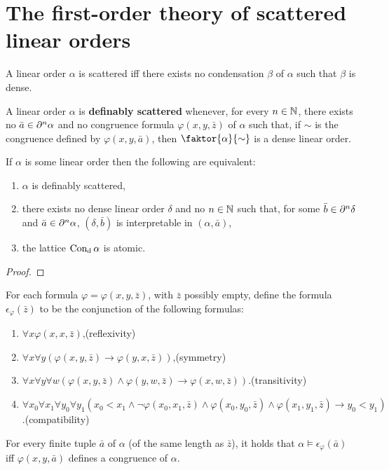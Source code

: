 \section{The first-order theory of scattered linear orders}


\begin{prp}
        A linear order $\alpha$ is scattered iff there exists no condensation $\beta$ of $\alpha$ such that $\beta$ is dense.
    \end{prp}

    \begin{dfn}
	    A linear order $\alpha$ is \textbf{definably scattered} whenever, for every $n\in\mathbb{N}$, there exists no $\bar{a}\in\partial^{n}\alpha$ and no congruence formula $\varphi(x,y,\bar{z})$ of $\alpha$ such that, if $\sim$ is the congruence defined by $\varphi(x,y,\bar{a})$, then $\faktor{\alpha}{\sim}$ is a dense linear order.
    \end{dfn}

\begin{prp}
        If $\alpha$ is some linear order then the following are equivalent:
        \begin{enumerate}
            \item   $\alpha$ is definably scattered,
	    \item   there exists no dense linear order $\delta$ and no $n\in\mathbb{N}$ such that, for some $\bar{b}\in\partial^{n}\delta$ and $\bar{a}\in\partial^{n}\alpha$, $(\delta,\bar{b})$ is interpretable in $(\alpha,\bar{a})$,
            \item   the lattice $\operatorname{Con_d}\alpha$ is atomic.
        \end{enumerate}
\end{prp}
    	\begin{proof}

	\end{proof}

\begin{prp}\label{prp:dcform}
	For each formula $\varphi=\varphi(x,y,\bar{z})$, with $\bar{z}$ possibly empty, define the formula $\epsilon_\varphi(\bar{z})$ to be the conjunction of the following formulas:
	\begin{enumerate}
		\item	$\forall x\varphi(x,x,\bar{z})$,\hfill(reflexivity)
		\item	$\forall x\forall y(\varphi(x,y,\bar{z})\rightarrow\varphi(y,x,\bar{z}))$,\hfill (symmetry)
		\item 	$\forall x\forall y\forall w(\varphi(x,y,\bar{z})\wedge\varphi(y,w,\bar{z})\rightarrow\varphi(x,w,\bar{z}))$.\hfill (transitivity)
		\item 	$\forall x_0\forall x_1\forall y_0\forall y_1(x_0<x_1\wedge\neg\varphi(x_0,x_1,\bar{z})\wedge\varphi(x_0,y_0,\bar{z})\wedge\varphi(x_1,y_1,\bar{z})\rightarrow y_0<y_1)$.\phantom{}\hfill(compatibility)
	\end{enumerate}
	For every finite tuple $\bar{a}$ of $\alpha$ (of the same length as $\bar{z}$), it holds that $\alpha\models\epsilon_\varphi(\bar{a})$ iff $\varphi(x,y,\bar{a})$ defines a congruence of $\alpha$.
\end{prp}


